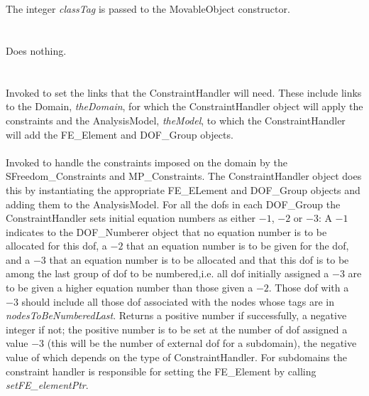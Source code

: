  \\
\\ 
The integer {\em classTag} is passed to the MovableObject constructor. \\

 \\
\\ 
Does nothing. \\

\\
 \\
Invoked to set the links that the ConstraintHandler will need. These
include links to the Domain, {\em theDomain}, for which the
ConstraintHandler object will apply the constraints and the
AnalysisModel, {\em theModel}, to which the ConstraintHandler will add
the FE\_Element and DOF\_Group objects. \\

 \\
Invoked to handle the constraints imposed on the domain by the
SFreedom\_Constraints and MP\_Constraints. The ConstraintHandler object does
this by instantiating the appropriate FE\_ELement and DOF\_Group objects 
and adding them to the AnalysisModel. For all the dofs in each
DOF\_Group the ConstraintHandler sets initial equation numbers as
either $-1$, $-2$ or $-3$: A $-1$ indicates to the DOF\_Numberer object
that no equation number is to be allocated for this dof, a $-2$ that
an equation number is to be given for the dof, and a $-3$ that an
equation number is to be allocated and that this dof is to
be among the last group of dof to be numbered,i.e. all dof initially
assigned a $-3$ are to be given a higher equation number than those
given a $-2$. Those dof with a $-3$ should include all those dof
associated with the nodes whose tags are in {\em
nodesToBeNumberedLast}. Returns a positive number if successfully, a
negative integer if not; the positive number is to be set at the
number of dof assigned a value $-3$ (this will be the number of
external dof for a subdomain), the negative value of which depends on
the type of ConstraintHandler. For subdomains the constraint handler
is responsible for setting the FE\_Element by calling {\em
setFE\_elementPtr}. \\    

